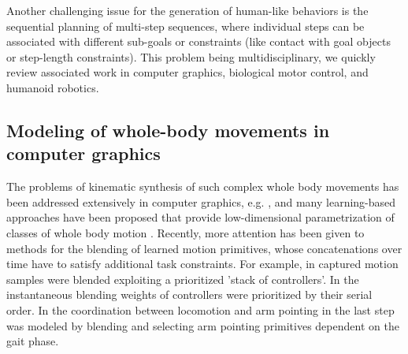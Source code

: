 Another challenging issue for the generation of human-like behaviors is the sequential planning of
multi-step sequences, where individual steps can be associated with different
sub-goals or constraints (like contact with goal objects or step-length constraints).
This problem being multidisciplinary, we quickly review associated work in computer graphics, biological motor control, and humanoid robotics.

\subsection{Modeling of whole-body movements in computer graphics}
The problems of kinematic synthesis of such complex whole body movements has been addressed
extensively in computer graphics, e.g. \cite{ref:lwhpk12}, and many learning-based approaches
have been proposed that provide low-dimensional parametrization of classes of whole body motion \cite{ref:wfh08}. Recently, more attention has been given
to  methods for the blending of learned motion primitives, whose concatenations over time have to
satisfy  additional task constraints.  For example, in \cite{ref:fxs12} captured motion samples were
blended exploiting a prioritized 'stack of controllers'. In \cite{ref:smkb14} the
instantaneous blending weights of controllers were prioritized by their serial order.
In \cite{ref:hk14} the coordination between locomotion and arm pointing in the
last step was modeled by blending and selecting arm pointing primitives dependent
on the gait phase.

